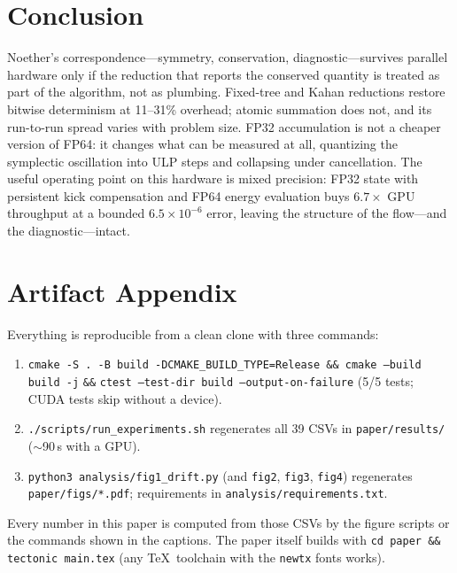 \documentclass[conference]{IEEEtran}
\begin{document}
\section{Conclusion}
\label{sec:conclusion}

Noether's correspondence---symmetry, conservation, diagnostic---survives
parallel hardware only if the reduction that reports the conserved quantity
is treated as part of the algorithm, not as plumbing. Fixed-tree and Kahan
reductions restore bitwise determinism at 11--31\% overhead; atomic
summation does not, and its run-to-run spread varies with problem size.
FP32 accumulation is not a cheaper version of FP64: it changes what can be
measured at all, quantizing the symplectic oscillation into ULP steps and
collapsing under cancellation. The useful operating point on this hardware
is mixed precision: FP32 state with persistent kick compensation and FP64
energy evaluation buys $6.7\times$ GPU throughput at a bounded
$6.5\times10^{-6}$ error, leaving the structure of the flow---and the
diagnostic---intact.

\section*{Artifact Appendix}
\label{sec:artifact}

Everything is reproducible from a clean clone with three commands:
\begin{enumerate}
\item \texttt{cmake -S . -B build -DCMAKE\_BUILD\_TYPE=Release \&\&
      cmake --build build -j} \texttt{\&\&} \texttt{ctest --test-dir build
      --output-on-failure} (5/5 tests; CUDA tests skip without a device).
\item \texttt{./scripts/run\_experiments.sh} regenerates all 39 CSVs in
      \texttt{paper/results/} ($\sim$90\,s with a GPU).
\item \texttt{python3 analysis/fig1\_drift.py} (and \texttt{fig2},
      \texttt{fig3}, \texttt{fig4}) regenerates
      \texttt{paper/figs/*.pdf}; requirements in
      \texttt{analysis/requirements.txt}.
\end{enumerate}
Every number in this paper is computed from those CSVs by the figure
scripts or the commands shown in the captions. The paper itself builds with
\texttt{cd paper \&\& tectonic main.tex} (any \TeX\ toolchain with the
\texttt{newtx} fonts works).
\end{document}
